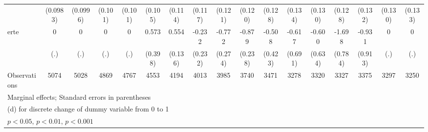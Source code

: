 {\begin{tabular}{l*{16}{c}}
                    &    (0.0983)         &    (0.0996)         &     (0.101)         &     (0.101)         &     (0.105)         &     (0.114)         &     (0.117)         &     (0.121)         &     (0.120)         &     (0.128)         &     (0.134)         &     (0.130)         &     (0.128)         &     (0.132)         &     (0.130)         &     (0.133)         \\
[1em]
erte                &           0         &           0         &           0         &           0         &       0.573         &       0.554\sym{***}&      -0.232         &      -0.772\sym{**} &      -0.879\sym{***}&      -0.508         &      -0.617         &      -0.600         &      -1.698\sym{*}  &      -0.931         &           0         &           0         \\
                    &         (.)         &         (.)         &         (.)         &         (.)         &     (0.398)         &     (0.136)         &     (0.232)         &     (0.274)         &     (0.238)         &     (0.423)         &     (0.691)         &     (0.634)         &     (0.784)         &     (0.913)         &         (.)         &         (.)         \\
\hline
Observations        &        5074         &        5028         &        4869         &        4767         &        4553         &        4194         &        4013         &        3985         &        3740         &        3471         &        3278         &        3320         &        3327         &        3375         &        3297         &        3250         \\
\hline\hline
\multicolumn{17}{l}{\footnotesize Marginal effects; Standard errors in parentheses}\\
\multicolumn{17}{l}{\footnotesize  (d) for discrete change of dummy variable from 0 to 1}\\
\multicolumn{17}{l}{\footnotesize \sym{*} \(p<0.05\), \sym{**} \(p<0.01\), \sym{***} \(p<0.001\)}\\
\end{tabular}
}
